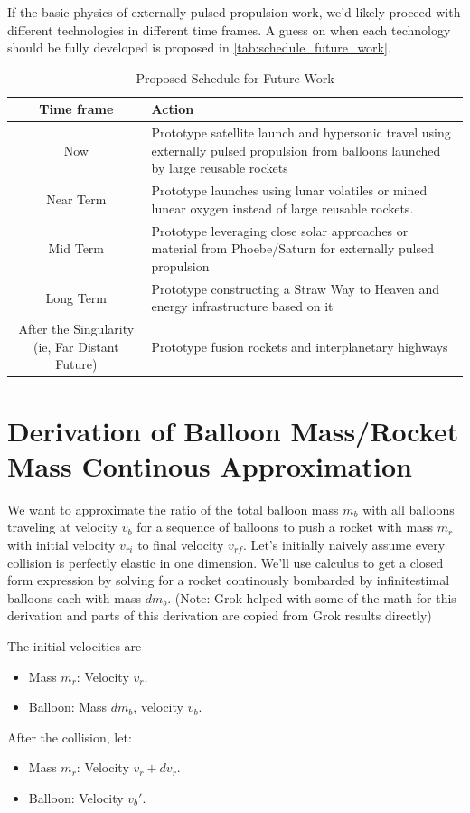 \documentclass{article}
\begin{document}
If the basic physics of externally pulsed propulsion work, we'd likely proceed with different technologies in different time frames.  A guess on when each technology should be fully developed is proposed in \autoref{tab:schedule_future_work}.


\begin{table}[htpb]
    \centering
    \begin{tabularx}{\textwidth}{|c|L|}\hline
        \textbf{Time frame} & \textbf{Action} \\\hline
        Now & Prototype satellite launch and hypersonic travel using externally pulsed propulsion from balloons launched by large reusable rockets\\\hline
        Near Term & Prototype launches using lunar volatiles or mined lunear oxygen instead of large reusable rockets. \\\hline
        Mid Term & Prototype leveraging close solar approaches or material from Phoebe/Saturn for externally  pulsed propulsion \\\hline
        Long Term & Prototype constructing a Straw Way to Heaven and energy infrastructure based on it \\\hline
        After the Singularity (ie, Far Distant Future) & Prototype fusion rockets and interplanetary highways \\\hline
    \end{tabularx}
    \caption{Proposed Schedule for Future Work}
    \label{tab:schedule_future_work}
\end{table}

\appendix 
\section{Derivation of Balloon Mass/Rocket Mass Continous Approximation}\label{sec:balloon_ratio_approximation}  We want to approximate the ratio of the total balloon mass \(m_b\) with all balloons traveling at velocity \(v_b\) for a sequence of balloons to push a rocket with mass \(m_r\) with initial velocity \(v_{ri}\) to final velocity \(v_{rf}\).   Let's initially naively assume every collision is perfectly elastic in one dimension.   We'll use calculus to get a  closed form expression by solving for a rocket  continously bombarded by infinitestimal balloons each with mass \(dm_b\).   (Note: Grok \cite{grok}  helped with some of the math for this derivation and parts of this derivation are copied from Grok  results directly)

The initial velocities are
\begin{itemize}
\item Mass \( m_r \): Velocity \( v_r \).
\item Balloon: Mass \( dm_b \), velocity \( v_b \).
\end{itemize}
After the collision, let:
\begin{itemize}
    \item Mass \( m_r \): Velocity \( v_r + dv_r \).
    \item Balloon: Velocity \( v_b' \).
\end{itemize}
\end{document}
